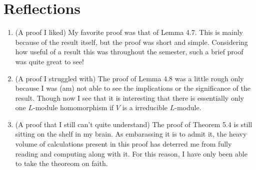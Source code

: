 \documentclass[12pt]{article}
\theoremstyle{definition}
\theoremstyle{definition}
\begin{document}
    \section{Reflections}
    \begin{enumerate}
        \item (A proof I liked) My favorite proof was that of Lemma 4.7. This
            is mainly because of the result itself, but the proof was short and
            simple. Considering how useful of a result this was throughout the
            semester, such a brief proof was quite great to see!
        \item (A proof I struggled with) The proof of Lemma 4.8 was a little
            rough only because I was (am) not able to see the implications or
            the significance of the result. Though now I see that it is
            interesting that there is essentially only one $L$-module
            homomorphism if $V$ is a irreducible $L$-module.
        \item (A proof that I still can't quite understand) The proof of
            Theorem 5.4 is still sitting on the shelf in my brain. As
            embarassing it is to admit it, the heavy volume of calculations
            present in this proof has deterred me from fully reading and
            computing along with it. For this reason, I have only been able to
            take the theoreom on faith. 
    \end{enumerate}
\end{document}

